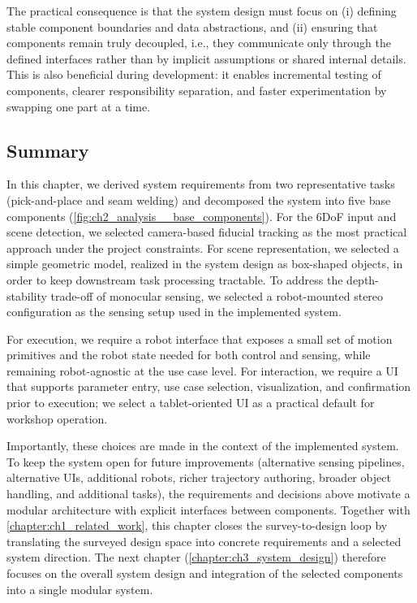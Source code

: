 The practical consequence is that the system design must focus on (i) defining stable component boundaries and data abstractions, and (ii) ensuring that components remain truly decoupled, i.e., they communicate only through the defined interfaces rather than by implicit assumptions or shared internal details. This is also beneficial during development: it enables incremental testing of components, clearer responsibility separation, and faster experimentation by swapping one part at a time.

\subsection{Summary} \label{subsec:ch2_analysis_summary}

In this chapter, we derived system requirements from two representative tasks (pick-and-place and seam welding) and decomposed the system into five base components (\autoref{fig:ch2_analysis__base_components}). For the 6DoF input and scene detection, we selected camera-based fiducial tracking as the most practical approach under the project constraints. For scene representation, we selected a simple geometric model, realized in the system design as box-shaped objects, in order to keep downstream task processing tractable. To address the depth-stability trade-off of monocular sensing, we selected a robot-mounted stereo configuration as the sensing setup used in the implemented system.

For execution, we require a robot interface that exposes a small set of motion primitives and the robot state needed for both control and sensing, while remaining robot-agnostic at the use case level. For interaction, we require a UI that supports parameter entry, use case selection, visualization, and confirmation prior to execution; we select a tablet-oriented UI as a practical default for workshop operation.

Importantly, these choices are made in the context of the implemented system. To keep the system open for future improvements (alternative sensing pipelines, alternative UIs, additional robots, richer trajectory authoring, broader object handling, and additional tasks), the requirements and decisions above motivate a modular architecture with explicit interfaces between components. Together with \autoref{chapter:ch1_related_work}, this chapter closes the survey-to-design loop by translating the surveyed design space into concrete requirements and a selected system direction. The next chapter (\autoref{chapter:ch3_system_design}) therefore focuses on the overall system design and integration of the selected components into a single modular system.
